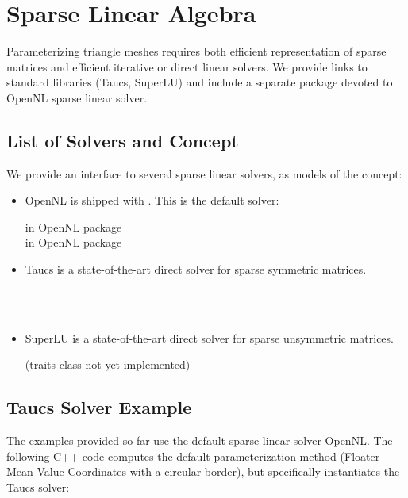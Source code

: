 \section{Sparse Linear Algebra}

Parameterizing triangle meshes requires both efficient representation
of sparse matrices and efficient iterative or direct linear
solvers. We provide links to standard libraries ({\sc Taucs}, SuperLU)
and include a separate package devoted to OpenNL sparse linear solver.

\subsection{List of Solvers and Concept}

We provide an interface to several sparse linear solvers, as models
of the  concept:

\begin{itemize}

\item OpenNL \cite{cgal:l-nmdgp-05} is shipped with \cgal. This is the default solver:

 in OpenNL package  \\
 in OpenNL package  \\

\item {\sc Taucs} is a state-of-the-art direct solver for sparse symmetric matrices.

  \\
  \\

\item SuperLU is a state-of-the-art direct solver for sparse unsymmetric matrices.

(traits class not yet implemented)

\end{itemize}


\subsection{{\sc Taucs} Solver Example}

The examples provided so far use the default sparse linear solver
OpenNL. The following C++ code computes the default parameterization
method (Floater Mean Value Coordinates with a circular border), but
specifically instantiates the {\sc Taucs} solver:

